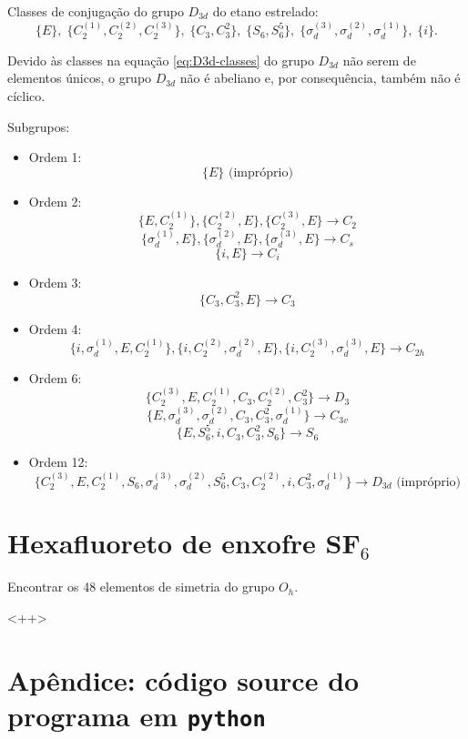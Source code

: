 \documentclass[a4paper,10pt]{article}
\newcommand{\python}[1]{\texttt{#1}}
\begin{document}
Classes de conjugação do grupo $D_{3d}$ do etano estrelado:
\begin{equation} \label{eq:D3d-classes}
\boxed{
\{ E \}, \;
\{ C_2^{(1)}, C_2^{(2)}, C_2^{(3)} \}, \;
\{ C_3, C_3^2 \}, \;
\{ S_6, S_6^5 \}, \;
\{ \sigma_d^{(3)}, \sigma_d^{(2)}, \sigma_d^{(1)} \}, \;
\{ i \}.
}
\end{equation}

Devido às classes na equação \ref{eq:D3d-classes} do grupo $D_{3d}$ não serem de elementos únicos, o grupo $D_{3d}$ não é abeliano e, por consequência, também não é cíclico.

\n

Subgrupos:
\begin{itemize}
\item Ordem 1:
$$
\{ E \} \text{ (impróprio)}
$$
\item Ordem 2:
$$
\{ E, C_2^{(1)} \},
\{ C_2^{(2)}, E \},
\{ C_2^{(3)}, E \} \to C_2
$$
$$
\{ \sigma_d^{(1)}, E \} ,
\{ \sigma_d^{(2)}, E \} ,
\{ \sigma_d^{(3)}, E \} \to C_s
$$
$$
\{ i, E \} \to C_i
$$
\item Ordem 3:
$$
\{ C_3, C_3^2, E \} \to C_3
$$
\item Ordem 4:
$$
\{ i, \sigma_d^{(1)}, E, C_2^{(1)} \},
\{ i, C_2^{(2)}, \sigma_d^{(2)}, E \},
\{ i, C_2^{(3)}, \sigma_d^{(3)}, E \} \to C_{2h}
$$
\item Ordem 6:
$$
\{ C_2^{(3)}, E, C_2^{(1)}, C_3, C_2^{(2)}, C_3^2 \} \to D_3
$$
$$
\{ E, \sigma_d^{(3)}, \sigma_d^{(2)}, C_3, C_3^2, \sigma_d^{(1)} \} \to C_{3v}
$$
$$
\{ E, S_6^5, i, C_3, C_3^2, S_6 \} \to S_6
$$
\item Ordem 12:
$$
\{ C_2^{(3)}, E, C_2^{(1)}, S_6, \sigma_d^{(3)}, \sigma_d^{(2)}, S_6^5, C_3, C_2^{(2)}, i, C_3^2, \sigma_d^{(1)} \}
\to D_{3d} \text{ (impróprio)}
$$
\end{itemize}

\pagebreak

\section*{Hexafluoreto de enxofre SF$_6$}

Encontrar os 48 elementos de simetria do grupo $O_h$.

<++>

\pagebreak

\section*{Apêndice: código source do programa em \python{python}} \label{sec:apendice}
\end{document}
